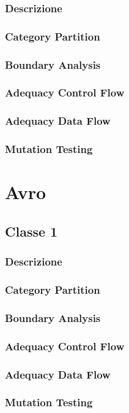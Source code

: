\documentclass[12pt, a4paper]{article}
\begin{document}
\subsubsection{Descrizione}
\subsubsection{Category Partition}
\subsubsection{Boundary Analysis}
\subsubsection{Adequacy Control Flow}
\subsubsection{Adequacy Data Flow}
\subsubsection{Mutation Testing}

\section{Avro}
\subsection{Classe 1}
\subsubsection{Descrizione}
\subsubsection{Category Partition}
\subsubsection{Boundary Analysis}
\subsubsection{Adequacy Control Flow}
\subsubsection{Adequacy Data Flow}
\subsubsection{Mutation Testing}
\end{document}
